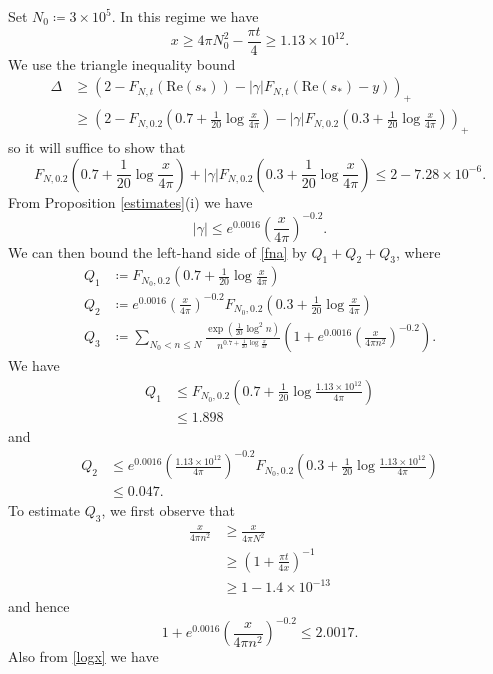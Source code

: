 Set $N_0 \coloneqq 3 \times 10^5$.  In this regime we have
$$ x \geq 4\pi N_0^2 - \frac{\pi t}{4} \geq 1.13 \times 10^{12}.$$
We use the triangle inequality bound
\begin{align*}
\Delta &\geq \left( 2 - F_{N,t}(\mathrm{Re}(s_*)) - |\gamma| F_{N,t}(\mathrm{Re}(s_*) - y) \right)_+ \\
&\geq \left( 2 - F_{N,0.2}(0.7 + \frac{1}{20} \log \frac{x}{4\pi}) - |\gamma| F_{N,0.2}(0.3 + \frac{1}{20} \log \frac{x}{4\pi}) \right)_+ 
\end{align*}
so it will suffice to show that
\begin{equation}\label{fna}
 F_{N,0.2}(0.7 + \frac{1}{20} \log \frac{x}{4\pi}) + |\gamma| F_{N,0.2}( 0.3 + \frac{1}{20} \log \frac{x}{4\pi} )  \leq 2 - 7.28 \times 10^{-6}.
\end{equation}
From Proposition \ref{estimates}(i) we have
$$ |\gamma| \leq e^{0.0016} \left( \frac{x}{4\pi} \right)^{-0.2}.$$
We can then bound the left-hand side of \eqref{fna} by $Q_1+Q_2+Q_3$, where
\begin{align*}
Q_1 &\coloneqq F_{N_0,0.2}(0.7 + \frac{1}{20} \log \frac{x}{4\pi}) \\
Q_2 &\coloneqq e^{0.0016} \left( \frac{x}{4\pi} \right)^{-0.2} F_{N_0,0.2}( 0.3 + \frac{1}{20} \log \frac{x}{4\pi} ) \\
Q_3 &\coloneqq \sum_{N_0 < n \leq N} \frac{\exp( \frac{1}{20} \log^2 n)}{n^{0.7 + \frac{1}{20} \log \frac{x}{4\pi}}} (1 + e^{0.0016} (\frac{x}{4\pi n^2})^{-0.2}).
\end{align*}
We have
\begin{align*}
Q_1 &\leq F_{N_0,0.2}(0.7 + \frac{1}{20} \log \frac{1.13 \times 10^{12}}{4\pi}) \\
&\leq 1.898
\end{align*}
and
\begin{align*}
Q_2 &\leq e^{0.0016} \left( \frac{1.13 \times 10^{12}}{4\pi} \right)^{-0.2}  F_{N_0,0.2}(0.3 + \frac{1}{20} \log \frac{1.13 \times 10^{12}}{4\pi}) \\
&\leq 0.047.
\end{align*}
To estimate $Q_3$, we first observe that
\begin{align*}
\frac{x}{4\pi n^2} &\geq \frac{x}{4\pi N^2} \\
&\geq \left(1 + \frac{\pi t}{4x}\right)^{-1} \\
&\geq 1 - 1.4 \times 10^{-13}
\end{align*}
and hence
$$ 1 + e^{0.0016} (\frac{x}{4\pi n^2})^{-0.2} \leq 2.0017.$$
Also from \eqref{logx} we have
